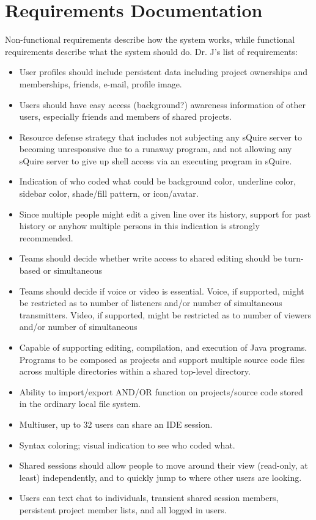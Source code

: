 \documentclass[11pt]{report}
\begin{document}
\chapter{Requirements Documentation}
    Non-functional requirements describe how the system works, while functional requirements describe what the system should do. Dr. J's list of requirements:
    \begin{itemize}
        \item User profiles should include persistent data including project ownerships and  memberships, friends, e-mail, profile image.
        \item Users should have easy access (background?) awareness information of other users, especially friends and members of shared projects.
        \item Resource defense strategy that includes not subjecting any sQuire server to becoming unresponsive due to a runaway program, and not allowing any sQuire server to give up shell access via an executing program in sQuire.
        \item Indication of who coded what could be background color, underline color, sidebar color, shade/fill pattern, or icon/avatar. 
        \item Since multiple people might edit a given line over its history, support for past history or anyhow multiple persons in this indication is strongly recommended.
        \item Teams should decide whether write access to shared editing should be turn-based or simultaneous
        \item Teams should decide if voice or video is essential. Voice, if supported, might be restricted as to number of listeners and/or number of simultaneous transmitters. Video, if supported, might be restricted as to number of viewers and/or number of simultaneous
        \item Capable of supporting editing, compilation, and execution of Java programs. Programs to be composed as projects and support multiple source code files across multiple directories within a shared top-level directory.
        \item Ability to import/export AND/OR function on projects/source code stored in the ordinary local file system.
        \item Multiuser, up to 32 users can share an IDE session.
        \item Syntax coloring; visual indication to see who coded what.
        \item Shared sessions should allow people to move around their view (read-only, at least) independently, and to quickly jump to where other users are looking.
        \item Users can text chat to individuals, transient shared session members, persistent project member lists, and all logged in users.
    \end{itemize}
\end{document}
